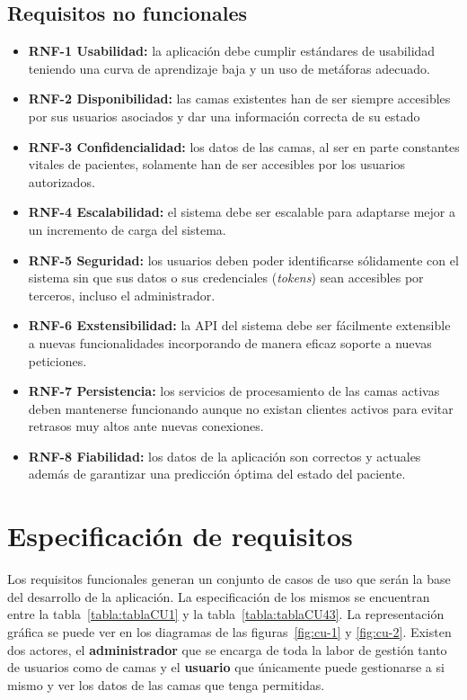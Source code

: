 \subsection{Requisitos no funcionales}\label{requisitos-no-funcionales}
\begin{itemize}
\tightlist
\item
\textbf{RNF-1 Usabilidad:} la aplicación debe cumplir estándares de usabilidad teniendo una curva de aprendizaje baja y un uso de metáforas adecuado.
\item 
\textbf{RNF-2 Disponibilidad:} las camas existentes han de ser siempre accesibles por sus usuarios asociados y dar una información correcta de su estado
\item 
\textbf{RNF-3 Confidencialidad:} los datos de las camas, al ser en parte constantes vitales de pacientes, solamente han de ser accesibles por los usuarios autorizados.
\item
\textbf{RNF-4 Escalabilidad:} el sistema debe ser escalable para adaptarse mejor a un incremento de carga del sistema.
\item 
\textbf{RNF-5 Seguridad:} los usuarios deben poder identificarse sólidamente con el sistema sin que sus datos o sus credenciales (\textit{tokens}) sean accesibles por terceros, incluso el administrador.
\item
\textbf{RNF-6 Exstensibilidad:} la API del sistema debe ser fácilmente extensible a nuevas funcionalidades incorporando de manera eficaz soporte a nuevas peticiones.
\item
\textbf{RNF-7 Persistencia:} los servicios de procesamiento de las camas activas deben mantenerse funcionando aunque no existan clientes activos para evitar retrasos muy altos ante nuevas conexiones.
\item
\textbf{RNF-8 Fiabilidad:} los datos de la aplicación son correctos y actuales además de garantizar una predicción óptima del estado del paciente.
\end{itemize}

\section{Especificación de requisitos}\label{casos-uso}

Los requisitos funcionales generan un conjunto de casos de uso que serán la base del desarrollo de la aplicación. La especificación de los mismos se encuentran entre la tabla~\ref{tabla:tablaCU1} y la tabla~\ref{tabla:tablaCU43}. La representación gráfica se puede ver en los diagramas de las figuras~\ref{fig:cu-1} y \ref{fig:cu-2}. Existen dos actores, el \textbf{administrador} que se encarga de toda la labor de gestión tanto de usuarios como de camas y el \textbf{usuario} que únicamente puede gestionarse a si mismo y ver los datos de las camas que tenga permitidas.

